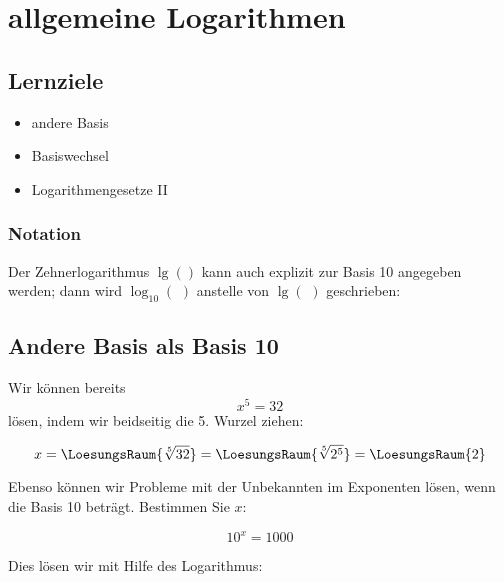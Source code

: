 
\section{allgemeine Logarithmen}
\subsection*{Lernziele}

\begin{itemize}
 \item andere Basis
 \item Basiswechsel
 \item Logarithmengesetze II
\end{itemize}




\subsubsection{Notation}
Der Zehnerlogarithmus $\lg()$ kann auch explizit zur Basis 10
angegeben werden; dann wird $\log_{10}(\,\,)$ anstelle von $\lg(\,\,)$ geschrieben:

\begin{center}
\end{center}


\newpage

\subsection{Andere Basis als Basis 10}

Wir können bereits $$x^5=32$$ lösen, indem wir beidseitig die
5. Wurzel ziehen:

$$x = \LoesungsRaum{\sqrt[5]{32}} = \LoesungsRaum{\sqrt[5]{2^5}} = \LoesungsRaum{2}$$

Ebenso können wir Probleme mit der Unbekannten im Exponenten lösen,
wenn die Basis 10 beträgt. Bestimmen Sie $x$:

$$10^x = 1000$$

Dies lösen wir mit Hilfe des Logarithmus:

